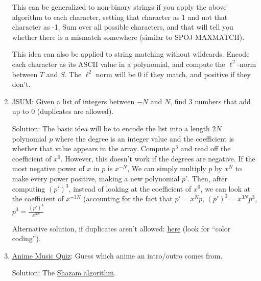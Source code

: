 \documentclass[11pt, oneside]{article}
\theoremstyle{plain}
\theoremstyle{definition}
\begin{document}
\begin{enumerate}
    This can be generalized to non-binary strings if you apply the above
    algorithm to each character, setting that character as 1 and not that
    character as -1. Sum over all possible characters, and that will tell you
    whether there is a mismatch somewhere (similar to SPOJ MAXMATCH).

    This idea can also be applied to string matching without wildcards.
    Encode each character as its ASCII value in a polynomial, and compute
    the \( \ell^2 \)-norm between \( T \) and \( S \). The \( \ell^2 \) norm
    will be 0 if they match, and positive if they don't.

  \item \href{https://en.wikipedia.org/wiki/3SUM}{3SUM}:
    Given a list of integers between \( -N \) and \( N \),
    find 3 numbers that add up to 0 (duplicates are allowed). 

    Solution: The basic idea will be to encode the list into a length \( 2N \)
    polynomial \( p \) where the degree is an integer value and the coefficient
    is whether that value appears in the array.
    Compute \( p^3 \) and read off the coefficient of \( x^0 \).
    However, this doesn't work if the degrees are negative. If the most negative
    power of \( x \) in \( p \) is \( x^{-N} \), We can simply multiply \( p \)
    by \( x^N \) to make every power positive, making a new polynomial \( p' \).
    Then, after computing \( (p')^3 \), instead of looking at the coefficient of
    \( x^0 \), we can look at the coefficient of \( x^{-3N} \)
    (accounting for the fact that \( p' = x^N p \), \( (p')^3 = x^{3N} p^3 \),
    \( p^3 = \frac{(p')^3}{x^{3N}} \)

    Alternative solution, if duplicates aren't allowed:
    \href{https://cs.stanford.edu/~rishig/courses/ref/l16.txt}{here}
    (look for \enquote{color coding}).

  \item \href{https://animemusicquiz.com/}{Anime Music Quiz}:
    Guess which anime an intro/outro comes from.

    Solution: The \href{https://www.toptal.com/algorithms/shazam-it-music-processing-fingerprinting-and-recognition}
    {Shazam algorithm}.

\end{enumerate}

\newpage
\end{document}
